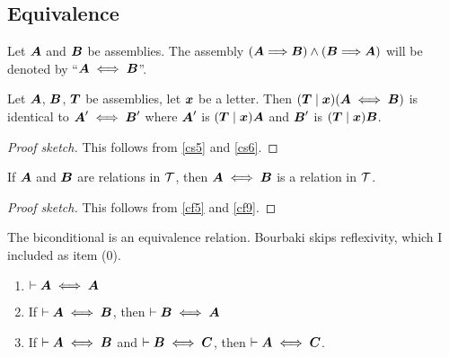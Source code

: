 \subsection{Equivalence}

\begin{definition}
Let $\boldsymbol{A}$ and $\boldsymbol{B}$ be assemblies. The
assembly
$(\boldsymbol{A}\Longrightarrow\boldsymbol{B})\land(\boldsymbol{B}\Longrightarrow\boldsymbol{A})$
will be denoted by ``$\boldsymbol{A}\iff\boldsymbol{B}$''.
\end{definition}

\begin{cs}\label{cs7}
Let $\boldsymbol{A}$, $\boldsymbol{B}$, $\boldsymbol{T}$ be
assemblies, let $\boldsymbol{x}$ be a letter. Then $(\boldsymbol{T}\mid\boldsymbol{x})(\boldsymbol{A}\iff\boldsymbol{B})$
is identical to $\boldsymbol{A}'\iff\boldsymbol{B}'$ where
$\boldsymbol{A}'$ is $(\boldsymbol{T}\mid\boldsymbol{x})\boldsymbol{A}$
and $\boldsymbol{B}'$ is $(\boldsymbol{T}\mid\boldsymbol{x})\boldsymbol{B}$.
\end{cs}

\begin{proof}[Proof sketch]
This follows from \ref{cs5} and \ref{cs6}.
\end{proof}

\begin{cf}\label{cf10}
If $\boldsymbol{A}$ and $\boldsymbol{B}$ are relations in $\mathcal{T}$,
then $\boldsymbol{A}\iff\boldsymbol{B}$ is a relation in $\mathcal{T}$.
\end{cf}

\begin{proof}[Proof sketch]
This follows from \ref{cf5} and \ref{cf9}.
\end{proof}

\begin{dc}\label{c22}
The biconditional is an equivalence relation. Bourbaki skips
reflexivity, which I included as item (0).
\begin{enumerate}[start=0]
\item $\vdash\boldsymbol{A}\iff\boldsymbol{A}$
\item If $\vdash\boldsymbol{A}\iff\boldsymbol{B}$, then $\vdash\boldsymbol{B}\iff\boldsymbol{A}$
\item If $\vdash\boldsymbol{A}\iff\boldsymbol{B}$ and $\vdash\boldsymbol{B}\iff\boldsymbol{C}$,
then $\vdash\boldsymbol{A}\iff\boldsymbol{C}$.
\end{enumerate}
\end{dc}

